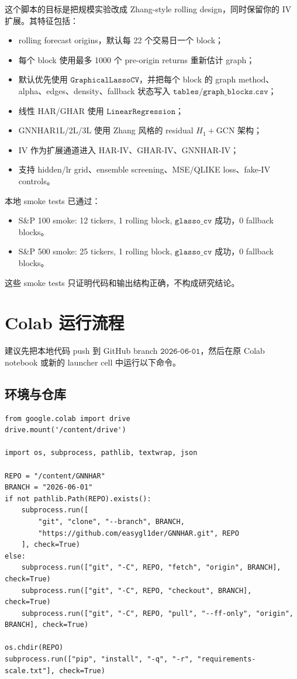 \documentclass[11pt,a4paper]{ctexart}
\begin{document}
这个脚本的目标是把规模实验改成 Zhang-style rolling design，同时保留你的 IV 扩展。其特征包括：

\begin{itemize}[leftmargin=*]
\item rolling forecast origins，默认每 22 个交易日一个 block；
\item 每个 block 使用最多 1000 个 pre-origin returns 重新估计 graph；
\item 默认优先使用 \(\texttt{GraphicalLassoCV}\)，并把每个 block 的 graph method、alpha、edges、density、fallback 状态写入 \(\texttt{tables/graph\_blocks.csv}\)；
\item 线性 HAR/GHAR 使用 \(\texttt{LinearRegression}\)；
\item GNNHAR1L/2L/3L 使用 Zhang 风格的 residual \(H_1+\mathrm{GCN}\) 架构；
\item IV 作为扩展通道进入 HAR-IV、GHAR-IV、GNNHAR-IV；
\item 支持 hidden/lr grid、ensemble screening、MSE/QLIKE loss、fake-IV controls。
\end{itemize}

本地 smoke tests 已通过：
\begin{itemize}[leftmargin=*]
\item S\&P 100 smoke: 12 tickers, 1 rolling block, \(\texttt{glasso\_cv}\) 成功，0 fallback blocks。
\item S\&P 500 smoke: 25 tickers, 1 rolling block, \(\texttt{glasso\_cv}\) 成功，0 fallback blocks。
\end{itemize}

这些 smoke tests 只证明代码和输出结构正确，不构成研究结论。

\section{Colab 运行流程}

建议先把本地代码 push 到 GitHub branch \(\texttt{2026-06-01}\)，然后在原 Colab notebook 或新的 launcher cell 中运行以下命令。

\subsection{环境与仓库}

\begin{lstlisting}
from google.colab import drive
drive.mount('/content/drive')

import os, subprocess, pathlib, textwrap, json

REPO = "/content/GNNHAR"
BRANCH = "2026-06-01"
if not pathlib.Path(REPO).exists():
    subprocess.run([
        "git", "clone", "--branch", BRANCH,
        "https://github.com/easygl1der/GNNHAR.git", REPO
    ], check=True)
else:
    subprocess.run(["git", "-C", REPO, "fetch", "origin", BRANCH], check=True)
    subprocess.run(["git", "-C", REPO, "checkout", BRANCH], check=True)
    subprocess.run(["git", "-C", REPO, "pull", "--ff-only", "origin", BRANCH], check=True)

os.chdir(REPO)
subprocess.run(["pip", "install", "-q", "-r", "requirements-scale.txt"], check=True)
\end{lstlisting}
\end{document}
